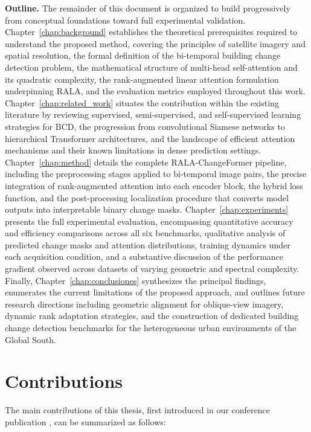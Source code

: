 \noindent\textbf{Outline.} The remainder of this document is organized to build progressively from conceptual foundations toward full experimental validation. Chapter~\ref{chap:background} establishes the theoretical prerequisites required to understand the proposed method, covering the principles of satellite imagery and spatial resolution, the formal definition of the bi-temporal building change detection problem, the mathematical structure of multi-head self-attention and its quadratic complexity, the rank-augmented linear attention formulation underpinning \ac{RALA}, and the evaluation metrics employed throughout this work. Chapter~\ref{chap:related_work} situates the contribution within the existing literature by reviewing supervised, semi-supervised, and self-supervised learning strategies for \ac{BCD}, the progression from convolutional Siamese networks to hierarchical Transformer architectures, and the landscape of efficient attention mechanisms and their known limitations in dense prediction settings. Chapter~\ref{chap:method} details the complete RALA-ChangeFormer pipeline, including the preprocessing stages applied to bi-temporal image pairs, the precise integration of rank-augmented attention into each encoder block, the hybrid loss function, and the post-processing localization procedure that converts model outputs into interpretable binary change masks. Chapter~\ref{chap:experiments} presents the full experimental evaluation, encompassing quantitative accuracy and efficiency comparisons across all six benchmarks, qualitative analysis of predicted change masks and attention distributions, training dynamics under each acquisition condition, and a substantive discussion of the performance gradient observed across datasets of varying geometric and spectral complexity. Finally, Chapter~\ref{chap:conclusiones} synthesizes the principal findings, enumerates the current limitations of the proposed approach, and outlines future research directions including geometric alignment for oblique-view imagery, dynamic rank adaptation strategies, and the construction of dedicated building change detection benchmarks for the heterogeneous urban environments of the Global South.


\section{Contributions}

The main contributions of this thesis, first introduced in our conference publication \cite{acuna2026efficient}, can be summarized as follows:

